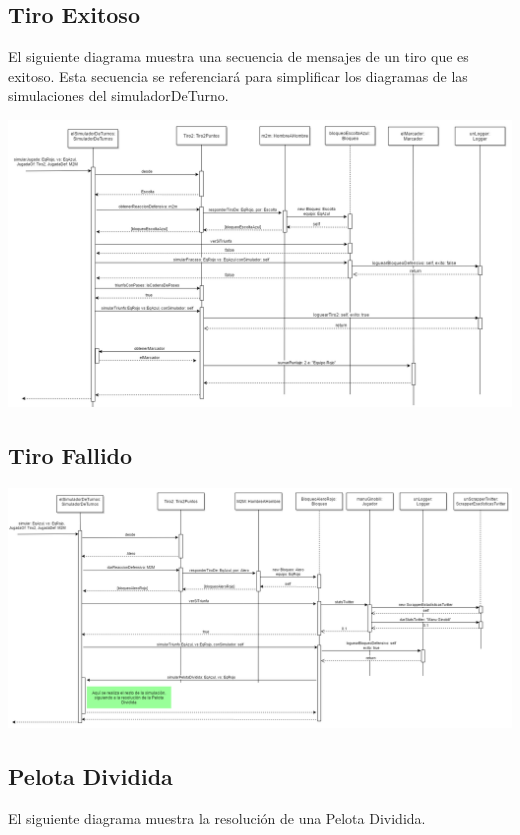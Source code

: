 \subsection{Tiro Exitoso}

El siguiente diagrama muestra una secuencia de mensajes de un tiro que es exitoso. Esta secuencia se referenciará para simplificar los diagramas de las simulaciones del simuladorDeTurno.

\includegraphics[height=0.60\textheight,keepaspectratio, angle =90 ]{imgs/TiroExitoso.png}

\subsection{Tiro Fallido}


\includegraphics[height=0.45\textheight,keepaspectratio, angle =90 ]{imgs/TiroFallido.png}

\subsection{Pelota Dividida}

El siguiente diagrama muestra la resolución de una Pelota Dividida.

